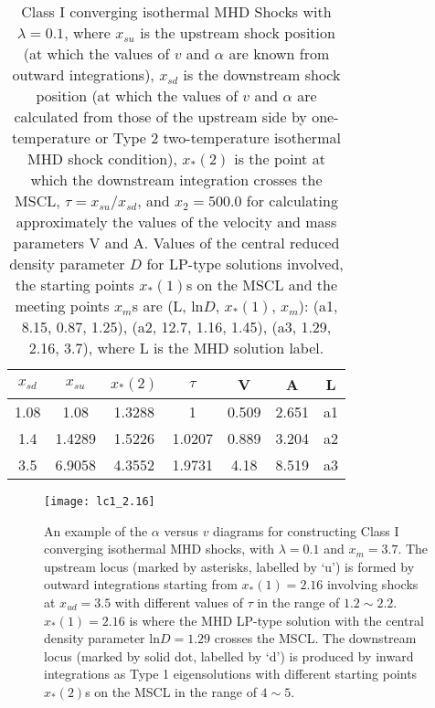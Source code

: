 \documentclass[fleqn,usenatbib]{mnras}
\begin{document}
\begin{table}
  \centering
  \caption{Class I converging isothermal MHD Shocks with $\lambda=0.1$, where $x_{su}$ is the upstream shock position (at which the values of $v$ and $\alpha$ are known from outward integrations), $x_{sd}$ is the downstream shock position (at which the values of $v$ and $\alpha$ are calculated from those of the upstream side by one-temperature or Type 2 two-temperature isothermal MHD shock condition), $x_{*}(2)$ is the point at which the downstream integration crosses the MSCL, $\tau=x_{su}/x_{sd}$, and $x_{2}=500.0$ for calculating approximately the values of the velocity and mass parameters V and A. Values of the central reduced density parameter $D$ for LP-type solutions involved, the starting points $x_{*}(1)$s on the MSCL and the meeting points $x_{m}$s are (L, $\mathrm{ln}D$, $x_{*}(1)$, $x_{m}$): (a1, 8.15, 0.87, 1.25), (a2, 12.7, 1.16, 1.45), (a3, 1.29, 2.16, 3.7), where L is the MHD solution label.}
    \begin{tabular}{ccccccc}
    \hline
    $x_{sd}$ & $x_{su}$ & $x_{*}(2)$ & $\tau$ & V & A & L\\
    \hline
    1.08 & 1.08 & 1.3288 & 1 & 0.509 & 2.651 & a1 \\
    1.4 & 1.4289 & 1.5226 & 1.0207 & 0.889 & 3.204 & a2\\
    3.5 & 6.9058 & 4.3552 & 1.9731 & 4.18 & 8.519 & a3\\
    \hline
    \end{tabular}
    \label{t2}
\end{table}    

\begin{figure}
\centering
\texttt{[image: lc1\_2.16]}
\caption{An example of the $\alpha$ versus $v$ diagrams for constructing Class I converging isothermal MHD shocks, with $\lambda=0.1$ and $x_{m}=3.7$. The upstream locus (marked by asterisks, labelled by `u') is formed by outward integrations starting from $x_{*}(1)=2.16$ involving shocks at $x_{ud}=3.5$ with different values of $\tau$ in the range of $1.2\sim 2.2$. $x_{*}(1)=2.16$ is where the MHD LP-type solution with the central density parameter $\mathrm{ln}D=1.29$ crosses the MSCL. The downstream locus (marked by solid dot, labelled by `d') is produced by inward integrations as Type 1 eigensolutions with different starting points $x_{*}(2)$s on the MSCL in the range of $4\sim 5$.}
\label{3}
\end{figure}
\end{document}
